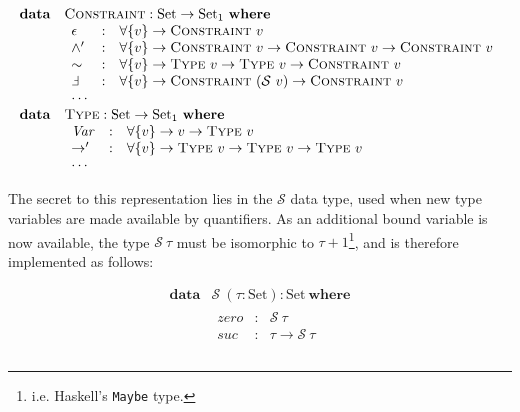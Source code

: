 \documentclass[a4paper]{jfp}
\begin{document}
\begin{displaymath}   
	\begin{array}{ll}
		\textbf{data} & \textsc{Constraint} : \text{Set} \rightarrow \text{Set}_1\ \textbf{where} \\
		              & \begin{array}{lcl}
                         \epsilon & : & \forall \{ v \} \rightarrow \textsc{Constraint}\ v \\
						 \land'   & : & \forall \{ v \} \rightarrow \textsc{Constraint}\ v \rightarrow \textsc{Constraint}\ v \rightarrow \textsc{Constraint}\ v \\
						 \sim     & : & \forall \{ v \} \rightarrow \textsc{Type}\ v \rightarrow \textsc{Type}\ v \rightarrow \textsc{Constraint}\ v \\
						 \Finv    & : & \forall \{ v \} \rightarrow \textsc{Constraint}\ (\mathcal{S}\ v) \rightarrow \textsc{Constraint}\ v \\
						 \cdots \\
					    \end{array} \\
		\textbf{data} & \textsc{Type} : \text{Set} \rightarrow \text{Set}_1\ \textbf{where} \\
		              & \begin{array}{lcl}
                         \mathit{Var} & : & \forall \{ v \} \rightarrow v \rightarrow \textsc{Type}\ v \\
						 \rightarrow' & : & \forall \{ v \} \rightarrow \textsc{Type}\ v \rightarrow \textsc{Type}\ v \rightarrow \textsc{Type}\ v \\
						 \cdots \\
					    \end{array} \\						
     \end{array}
\end{displaymath}	 

The secret to this representation lies in the $\mathcal{S}$ data type, used when new type variables are made available by quantifiers. As an additional bound variable is now available, the type $\mathcal{S}\ \tau$ must be isomorphic to $\tau + 1$\footnote{i.e. Haskell's {\tt Maybe} type.}, and is therefore implemented as follows:

\begin{displaymath}   
	\begin{array}{ll}		
		\textbf{data} & \mathcal{S}\ (\tau : \text{Set}) : \text{Set}\ \textbf{where} \\
		              & \begin{array}{lcl}
                         \mathit{zero} & : & \mathcal{S}\ \tau \\
						 \mathit{suc} & : & \tau \rightarrow \mathcal{S}\ \tau \\
					    \end{array} \\						
     \end{array}
\end{displaymath}	 
\end{document}
